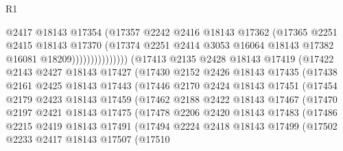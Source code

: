 \begin{lexlean}{R1}
\begin{coremodule}
                                @2417
                                @18143
                                @17354
                                (@17357
                                  @2242
                                  @2416
                                  @18143
                                  @17362
                                  (@17365
                                    @2251
                                    @2415
                                    @18143
                                    @17370
                                    (@17374
                                      @2251
                                      @2414
                                      @3053
                                      @16064
                                      @18143
                                      @17382
                                      @16081
                                      @18209)))))))))))))))
        (@17413
          @2135
          @2428
          @18143
          @17419
          (@17422
            @2143
            @2427
            @18143
            @17427
            (@17430
              @2152
              @2426
              @18143
              @17435
              (@17438
                @2161
                @2425
                @18143
                @17443
                (@17446
                  @2170
                  @2424
                  @18143
                  @17451
                  (@17454
                    @2179
                    @2423
                    @18143
                    @17459
                    (@17462
                      @2188
                      @2422
                      @18143
                      @17467
                      (@17470
                        @2197
                        @2421
                        @18143
                        @17475
                        (@17478
                          @2206
                          @2420
                          @18143
                          @17483
                          (@17486
                            @2215
                            @2419
                            @18143
                            @17491
                            (@17494
                              @2224
                              @2418
                              @18143
                              @17499
                              (@17502
                                @2233
                                @2417
                                @18143
                                @17507
                                (@17510

\end{coremodule}
\end{lexlean}
